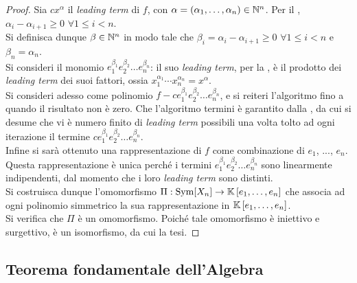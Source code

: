 \begin{proof}
    Sia $c x^\alpha$ il \textit{leading term} di $f$, con
    $\alpha = (\alpha_1, \ldots, \alpha_n) \in \mathbb N^n$.
    Per il ,
    $\alpha_i - \alpha_{i+1} \geq 0$ $\forall 1 \leq i < n$. \\
    
    Si definisca dunque $\beta \in \mathbb N^n$ in modo tale
    che $\beta_i = \alpha_i - \alpha_{i+1} \geq 0$ $\forall 1 \leq i < n$
    e $\beta_n = \alpha_n$. \\
    
    Si consideri il monomio $e_1^{\beta_1} e_2^{\beta_2} \ldots e_n^{\beta_n}$:
    il suo \textit{leading term}, per la ,
    è il prodotto dei \textit{leading term} dei suoi fattori,
    ossia $x_1^{\alpha_1} \cdots x_n^{\alpha_n} = x^\alpha$. \\
    
    Si consideri adesso come polinomio $f - c e_1^{\beta_1} e_2^{\beta_2} \ldots e_n^{\beta_n}$,
    e si reiteri l'algoritmo fino a quando il risultato non è zero. Che l'algoritmo
    termini è garantito dalla , da cui
    si desume che vi è numero finito di \textit{leading term} possibili una
    volta tolto ad ogni iterazione il termine $c e_1^{\beta_1} e_2^{\beta_2} \ldots e_n^{\beta_n}$. \\
    
    Infine si sarà ottenuto una rappresentazione di $f$ come combinazione di
    $e_1$, ..., $e_n$. Questa rappresentazione è unica perché
    i termini $e_1^{\beta_1} e_2^{\beta_2} \ldots e_n^{\beta_n}$ sono
    linearmente indipendenti, dal momento che i loro
    \textit{leading term} sono distinti. \\
    
    Si costruisca dunque l'omomorfismo $\Pi : \operatorname{Sym}[X_n] \to \mathbb{K}\left[e_1, \ldots, e_n\right]$
    che associa ad ogni polinomio simmetrico la sua rappresentazione in
    $\mathbb{K}\left[e_1, \ldots, e_n\right]$. \\
    
    Si verifica che $\Pi$ è un omomorfismo. Poiché tale omomorfismo è iniettivo
    e surgettivo, è un isomorfismo, da cui la tesi.
\end{proof}

\subsection{Teorema fondamentale dell'Algebra}


